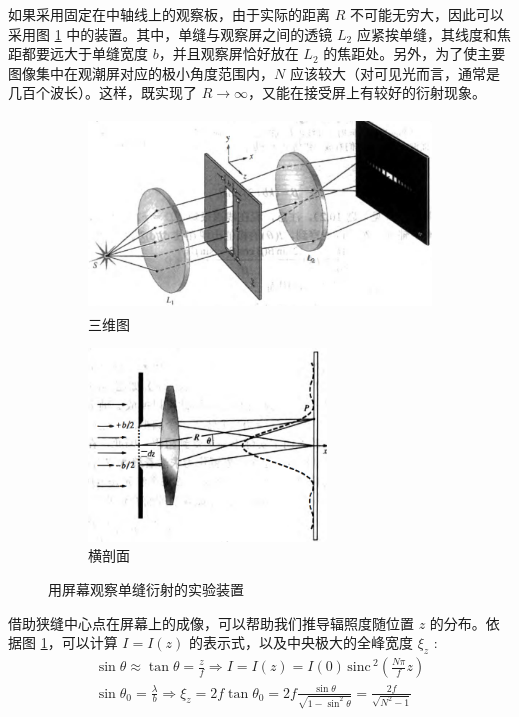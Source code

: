 \documentclass[UTF8]{report}
\def\sinc{\mathrm{\,sinc}\,}
\theoremstyle{MyLineTheoremStyle} %
\theoremstyle{MyBlockTheoremStyle} %
\theoremstyle{MySubsubsectionStyle} %
\begin{document}
如果采用固定在中轴线上的观察板，由于实际的距离 $R$ 不可能无穷大，因此可以采用图 \ref{用屏幕观察单缝衍射的实验装置} 中的装置。其中，单缝与观察屏之间的透镜 $L_2$ 应紧挨单缝，其线度和焦距都要远大于单缝宽度 $b$，并且观察屏恰好放在 $L_2$ 的焦距处。另外，为了使主要图像集中在观潮屏对应的极小角度范围内，$N$ 应该较大（对可见光而言，通常是几百个波长）。这样，既实现了 $R \to \infty$，又能在接受屏上有较好的衍射现象。

\begin{figure}[H]\centering
\begin{subfigure}[b]{0.57\columnwidth}\centering
    \includegraphics[height=145pt]{assets/4/4.3 辐照度位置仪2.jpg}
    \caption{三维图}
\end{subfigure}\hfill
\begin{subfigure}[b]{0.36\columnwidth}\centering
    \includegraphics[height=145pt]{assets/4/4.3 辐照度位置仪.png}
    \caption{横剖面}
\end{subfigure}
\caption{用屏幕观察单缝衍射的实验装置}
\label{用屏幕观察单缝衍射的实验装置}
\end{figure}

借助狭缝中心点在屏幕上的成像，可以帮助我们推导辐照度随位置 $z$ 的分布。依据图 \ref{用屏幕观察单缝衍射的实验装置}，可以计算 $I = I(z)$ 的表示式，以及中央极大的全峰宽度 $\xi_z$ : 
\begin{gather}
    \sin \theta \approx \tan \theta = \frac{z}{f} \Longrightarrow I = I(z) = I(0) \sinc^2 \left( \frac{N \pi}{f} z\right) \\ 
    \sin \theta_0 = \frac{\lambda}{b} \Longrightarrow \xi_z = 2 f \tan \theta_0 = 2f\frac{\sin \theta}{\sqrt{1 - \sin^2 \theta}} = \frac{2f}{\sqrt{N^2 - 1}}
\end{gather}
\end{document}
